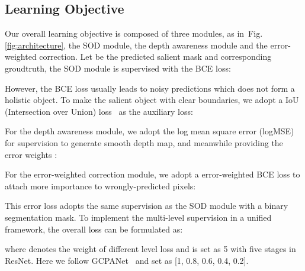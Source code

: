 \documentclass[sigconf]{acmart}
\newcommand{\figref}[1]{Fig. \ref{#1}}
\begin{document}
\subsection{Learning Objective}

Our overall learning objective is composed of three modules, as in~\figref{fig:architecture}, the SOD module, the depth awareness module and the error-weighted correction. Let  be the predicted salient mask and corresponding groudtruth, the SOD module is supervised with the BCE loss:

However, the BCE loss usually leads to noisy predictions which does not form a holistic object. To make the salient object with clear boundaries, we adopt a IoU (Intersection over Union) loss~\cite{F3Net, qin2019basnet} as the auxiliary loss:


For the depth awareness module, we adopt the log mean square error (logMSE) for supervision \cite{eigen2014depth,eigen2015predicting} to generate smooth depth map, and meanwhile providing the error weights :


For the error-weighted correction module, we adopt a error-weighted BCE loss to attach more importance to wrongly-predicted pixels:

This error loss  adopts the same supervision as the SOD module with a binary segmentation mask. To implement the multi-level supervision in a unified framework, the overall loss can be formulated as:

where  denotes the weight of different level loss and  is set as 5 with five stages in ResNet. Here we follow GCPANet~\cite{chen2020global} and set  as [1, 0.8, 0.6, 0.4, 0.2]. 
\end{document}
